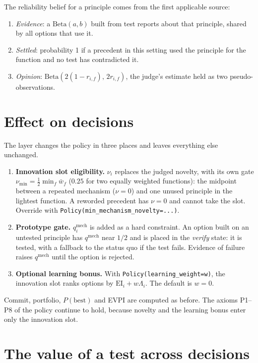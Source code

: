 \documentclass[11pt]{article}
\begin{document}
\noindent The reliability belief for a principle comes from the first applicable source:
\begin{enumerate}
\item \emph{Evidence}: a $\mathrm{Beta}(a,b)$ built from test reports about that principle, shared by
all options that use it.
\item \emph{Settled}: probability 1 if a precedent in this setting used the principle for the
function and no test has contradicted it.
\item \emph{Opinion}: $\mathrm{Beta}(2(1-r_{i,f}),\,2r_{i,f})$, the judge's estimate held as two
pseudo-observations.
\end{enumerate}

\section{Effect on decisions}

The layer changes the policy in three places and leaves everything else unchanged.
\begin{enumerate}
\item \textbf{Innovation slot eligibility.} $\nu_i$ replaces the judged novelty, with its own gate
$\nu_{\min}=\tfrac12\min_f\bar w_f$ ($0.25$ for two equally weighted functions): the midpoint between
a repeated mechanism ($\nu=0$) and one unused principle in the lightest function. A reworded precedent
has $\nu=0$ and cannot take the slot. Override with \texttt{Policy(min\_mechanism\_novelty=...)}.
\item \textbf{Prototype gate.} $q_i^{\mathrm{mech}}$ is added as a hard constraint. An option built
on an untested principle has $q^{\mathrm{mech}}$ near $1/2$ and is placed in the \emph{verify}
state: it is tested, with a fallback to the status quo if the test fails. Evidence of failure
raises $q^{\mathrm{mech}}$ until the option is rejected.
\item \textbf{Optional learning bonus.} With \texttt{Policy(learning\_weight=w)}, the innovation slot
ranks options by $\mathrm{EI}_i+w\Lambda_i$. The default is $w=0$.
\end{enumerate}
Commit, portfolio, $P(\mathrm{best})$ and EVPI are computed as before. The axioms P1--P8 of the
policy continue to hold, because novelty and the learning bonus enter only the innovation slot.

\section{The value of a test across decisions}
\end{document}

